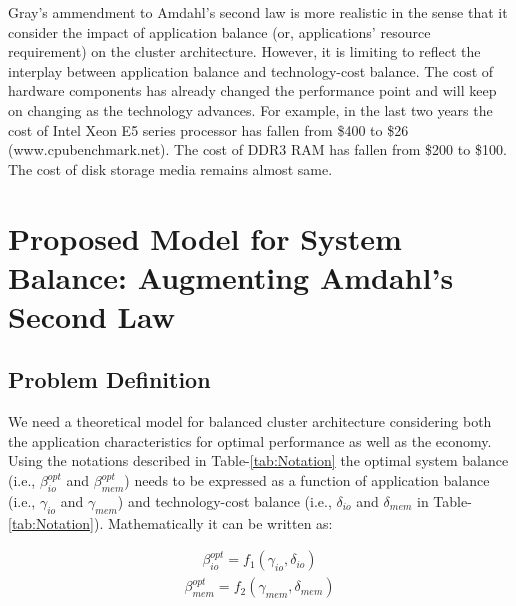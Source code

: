 \documentclass[journal]{IEEEtran}
\begin{document}
Gray's ammendment to Amdahl's second law is more realistic in the sense that it consider the impact of application balance (or, applications' resource requirement) on the cluster architecture.  However, it is limiting to reflect the interplay between application balance and technology-cost balance. The cost of hardware components has already changed the performance point and will keep on changing as the technology advances. For example, in the last two years the cost of Intel Xeon E5 series processor has fallen from \$400 to \$26 (www.cpubenchmark.net). The cost of DDR3 RAM has fallen from  \$200 to \$100. The cost of disk storage media remains almost same. 

\section{Proposed Model for System Balance: Augmenting Amdahl's Second Law}
\subsection{Problem Definition}
We need a theoretical model for balanced cluster architecture considering both the application characteristics for optimal performance as well as the economy. Using the notations described in Table-\ref{tab:Notation} the optimal system balance (i.e., $\beta_{io}^{opt}$ and $\beta_{mem}^{opt}$) needs to be expressed as a function of application balance (i.e., $\gamma_{io}$ and $\gamma_{mem}$) and technology-cost balance (i.e., $\delta_{io}$ and $\delta_{mem}$ in Table-\ref{tab:Notation}). Mathematically it can be written as:

\begin{equation} \label{eqn:BalancedIONotation}
\begin{split}
\beta_{io}^{opt} = f_1(\gamma_{io}, \delta_{io})
\end{split}
\end{equation}
\begin{equation} \label{eqn:BalancedMemNotation}
\begin{split}
\beta_{mem}^{opt} = f_2(\gamma_{mem}, \delta_{mem})
\end{split}
\end{equation}
\end{document}
